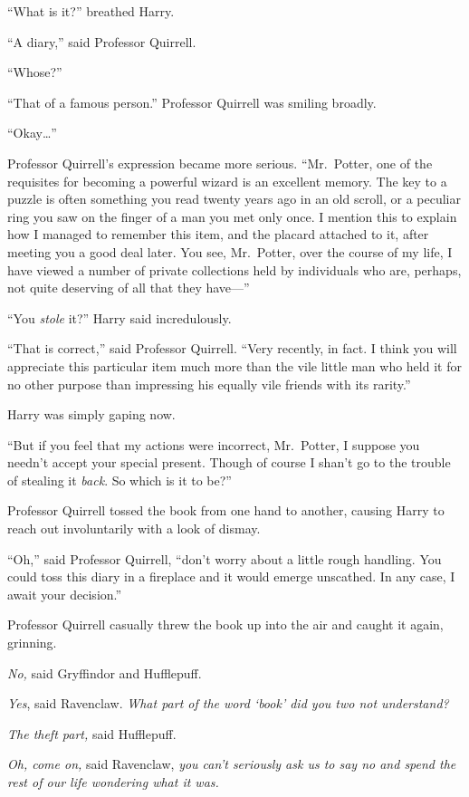 ``What is it?'' breathed Harry.

``A diary,'' said Professor Quirrell.

``Whose?''

``That of a famous person.'' Professor Quirrell was smiling broadly.

``Okay\ldots{}''

Professor Quirrell's expression became more serious. ``Mr.~Potter, one
of the requisites for becoming a powerful wizard is an excellent memory.
The key to a puzzle is often something you read twenty years ago in an
old scroll, or a peculiar ring you saw on the finger of a man you met
only once. I mention this to explain how I managed to remember this
item, and the placard attached to it, after meeting you a good deal
later. You see, Mr.~Potter, over the course of my life, I have viewed a
number of private collections held by individuals who are, perhaps, not
quite deserving of all that they have---''

``You \emph{stole} it?'' Harry said incredulously.

``That is correct,'' said Professor Quirrell. ``Very recently, in fact.
I think you will appreciate this particular item much more than the vile
little man who held it for no other purpose than impressing his equally
vile friends with its rarity.''

Harry was simply gaping now.

``But if you feel that my actions were incorrect, Mr.~Potter, I suppose
you needn't accept your special present. Though of course I shan't go to
the trouble of stealing it \emph{back}. So which is it to be?''

Professor Quirrell tossed the book from one hand to another, causing
Harry to reach out involuntarily with a look of dismay.

``Oh,'' said Professor Quirrell, ``don't worry about a little rough
handling. You could toss this diary in a fireplace and it would emerge
unscathed. In any case, I await your decision.''

Professor Quirrell casually threw the book up into the air and caught it
again, grinning.

\emph{No,} said Gryffindor and Hufflepuff.

\emph{Yes}, said Ravenclaw. \emph{What part of the word `book' did you
two not understand?}

\emph{The theft part,} said Hufflepuff.

\emph{Oh, come on,} said Ravenclaw, \emph{you can't seriously ask us to
say no and spend the rest of our life wondering what it was.}

